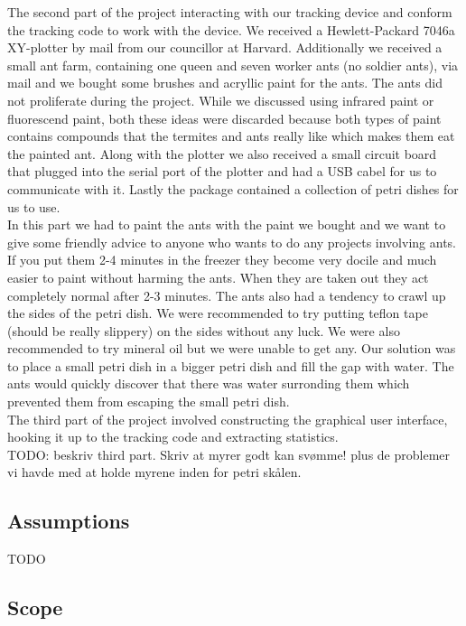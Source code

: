 The second part of the project interacting with our tracking device and conform the tracking code to work with the device. We received a Hewlett-Packard 7046a XY-plotter by mail from our councillor at Harvard. Additionally we received a small ant farm, containing one queen and seven worker ants (no soldier ants), via mail and we bought some brushes and acryllic paint for the ants. The ants did not proliferate during the project. While we discussed using infrared paint or fluorescend paint, both these ideas were discarded because both types of paint contains compounds that the termites and ants really like which makes them eat the painted ant. Along with the plotter we also received a small circuit board that plugged into the serial port of the plotter and had a USB cabel for us to communicate with it. Lastly the package contained a collection of petri dishes for us to use. \\

In this part we had to paint the ants with the paint we bought and we want to give some friendly advice to anyone who wants to do any projects involving ants. If you put them 2-4 minutes in the freezer they become very docile and much easier to paint without harming the ants. When they are taken out they act completely normal after 2-3 minutes. The ants also had a tendency to crawl up the sides of the petri dish. We were recommended to try putting teflon tape (should be really slippery) on the sides without any luck. We were also recommended to try mineral oil but we were unable to get any. Our solution was to place a small petri dish in a bigger petri dish and fill the gap with water. The ants would quickly discover that there was water surronding them which prevented them from escaping the small petri dish. \\

The third part of the project involved constructing the graphical user interface, hooking it up to the tracking code and extracting statistics.  \\

TODO: beskriv third part. Skriv at myrer godt kan svømme! plus de problemer vi havde med at holde myrene inden for petri skålen.  

\subsection{Assumptions}

TODO

\subsection{Scope}

